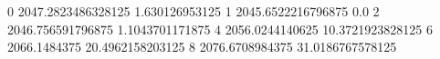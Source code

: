 0 2047.2823486328125 1.630126953125
1 2045.6522216796875 0.0
2 2046.756591796875 1.1043701171875
4 2056.0244140625 10.3721923828125
6 2066.1484375 20.4962158203125
8 2076.6708984375 31.0186767578125
